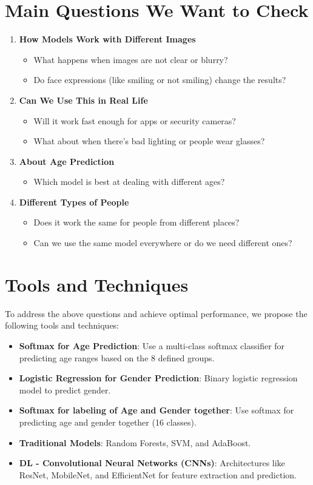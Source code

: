 \documentclass[a4paper,12pt]{article}
\begin{document}
\section{Main Questions We Want to Check}
\begin{enumerate}[leftmargin=1.5cm]
\item \textbf{How Models Work with Different Images}
\begin{itemize}
    \item What happens when images are not clear or blurry?
    \item Do face expressions (like smiling or not smiling) change the results?
\end{itemize}

\item \textbf{Can We Use This in Real Life}
\begin{itemize}
    \item Will it work fast enough for apps or security cameras?
    \item What about when there's bad lighting or people wear glasses?
\end{itemize}

\item \textbf{About Age Prediction}
\begin{itemize}
    \item Which model is best at dealing with different ages?
\end{itemize}

\item \textbf{Different Types of People}
\begin{itemize}
    \item Does it work the same for people from different places?
    \item Can we use the same model everywhere or do we need different ones?
\end{itemize}
\end{enumerate}

\section{Tools and Techniques}
To address the above questions and achieve optimal performance, we propose the following tools and techniques:
\begin{itemize}[leftmargin=1.5cm]
    \item \textbf{Softmax for Age Prediction}: Use a multi-class softmax classifier for predicting age ranges based on the 8 defined groups.
    \item \textbf{Logistic Regression for Gender Prediction}: Binary logistic regression model to predict gender.
    \item \textbf{Softmax for labeling of Age and Gender together}: Use softmax for predicting age and gender together (16 classes).
    \item \textbf{Traditional Models}: Random Forests, SVM, and AdaBoost.
    \item \textbf{DL - Convolutional Neural Networks (CNNs)}: Architectures like ResNet, MobileNet, and EfficientNet for feature extraction and prediction.
\end{itemize}
\end{document}
